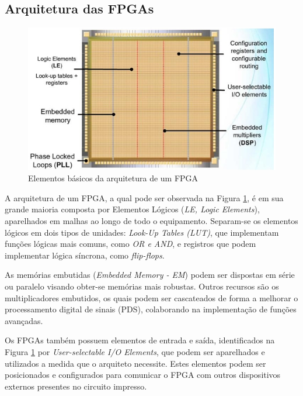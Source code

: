 \documentclass[
	11pt,				%
	openany,			%
	oneside,
	a4paper,			%
	chapter=TITLE,		%
	section=TITLE,		%
	english,			%
	brazil				%
	]{abntex2}
\begin{document}
\subsection{Arquitetura das FPGAs}

\begin{figure}[htb]
	\caption{\label{fig_arquiteturafpga}Elementos básicos da arquitetura de um FPGA}
	\begin{center}
	    \includegraphics[scale=0.5]{fpga.jpg}
	\end{center}
\end{figure}

A arquitetura de um FPGA, a qual pode ser observada na Figura  \ref{fig_arquiteturafpga}, é em sua grande maioria composta por Elementos Lógicos (\textit{LE, Logic Elements}), aparelhados em malhas ao longo de todo o equipamento. Separam-se os elementos lógicos em dois tipos de unidades: \textit{Look-Up Tables (LUT)}, que implementam funções lógicas mais comuns, como \textit{OR e AND}, e registros que podem implementar lógica síncrona, como \textit{flip-flops}. \cite{arquiteturafpga}

  As memórias embutidas (\textit{Embedded Memory - EM}) podem ser dispostas em série ou paralelo visando obter-se memórias mais robustas. Outros recursos são os multiplicadores embutidos, os quais podem ser cascateados de forma a melhorar o processamento digital de sinais (PDS), colaborando na implementação de funções avançadas.\cite{arquiteturafpga}
 
  Os FPGAs também possuem elementos de entrada e saída, identificados na Figura \ref{fig_arquiteturafpga} por \textit{User-selectable I/O Elements}, que podem ser aparelhados e utilizados a medida que o arquiteto necessite. Estes elementos podem ser posicionados e configurados para comunicar o FPGA com outros dispositivos externos presentes no circuito impresso. \cite{arquiteturafpga} \cite{}
  
\end{document}

